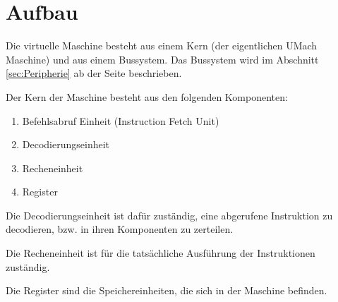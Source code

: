 \section{Aufbau}
\label{sec:Aufbau}
Die virtuelle Maschine besteht aus einem Kern (der eigentlichen UMach Maschine)
und aus einem Bussystem. Das Bussystem wird im Abschnitt \ref{sec:Peripherie}
ab der Seite \pageref{sec:Peripherie} beschrieben.

Der Kern der Maschine besteht aus den folgenden Komponenten:

\begin{enumerate}
  \item Befehlsabruf Einheit (Instruction Fetch Unit)
  \item Decodierungseinheit
  \item Recheneinheit
  \item Register
\end{enumerate}

Die Decodierungseinheit ist dafür zuständig, eine abgerufene Instruktion zu
decodieren, bzw. in ihren Komponenten zu zerteilen.

Die Recheneinheit ist für die tatsächliche Ausführung der Instruktionen
zuständig. 

Die Register sind die Speichereinheiten, die sich in der Maschine befinden.


